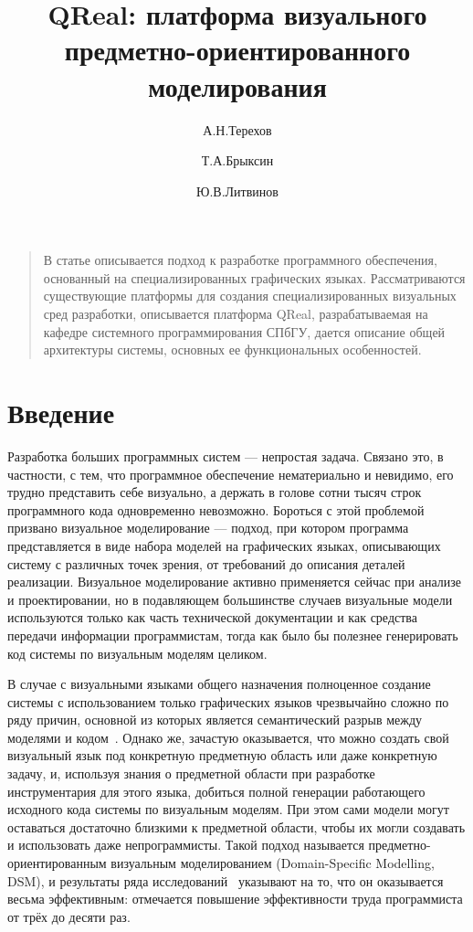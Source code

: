 \documentclass[a4]{article}
\title{QReal: платформа визуального предметно-ориентированного моделирования}
\author{А.Н.Терехов \and Т.А.Брыксин \and Ю.В.Литвинов}
\date{}
\begin{document}
\maketitle
\thispagestyle{empty}

\begin{quote}
\small\noindent
В статье описывается подход к разработке программного обеспечения, основанный на специализированных графических языках. Рассматриваются существующие платформы для создания специализированных визуальных сред разработки, описывается платформа QReal, разрабатываемая на кафедре системного программирования СПбГУ, дается описание общей архитектуры системы, основных ее функциональных особенностей.
\end{quote}

\section*{Введение}

Разработка больших программных систем --- непростая задача. Связано это, в частности, с тем, что программное обеспечение нематериально и невидимо, его трудно представить себе визуально, а держать в голове сотни тысяч строк программного кода одновременно невозможно. Бороться с этой проблемой призвано визуальное моделирование --- подход, при котором программа представляется в виде набора моделей на графических языках, описывающих систему с различных точек зрения, от требований до описания деталей реализации. Визуальное моделирование активно применяется сейчас при анализе и проектировании, но в подавляющем большинстве случаев визуальные модели используются только как часть технической документации и как средства передачи информации программистам, тогда как было бы полезнее генерировать код системы по визуальным моделям целиком.

В случае с визуальными языками общего назначения полноценное создание системы с использованием только графических языков чрезвычайно сложно по ряду причин, основной из которых является семантический разрыв между моделями и кодом~\cite{koznov}. Однако же, зачастую оказывается, что можно создать свой визуальный язык под конкретную предметную область или даже конкретную задачу, и, используя знания о предметной области при разработке инструментария для этого языка, добиться полной генерации работающего исходного кода системы по визуальным моделям. При этом сами модели могут оставаться достаточно близкими к предметной области, чтобы их могли создавать и использовать даже непрограммисты. Такой подход называется предметно-ориентированным визуальным моделированием (Domain-Specific Modelling, DSM), и результаты ряда исследований~\cite{dsm2, dsm3, dsm1} указывают на то, что он оказывается весьма эффективным: отмечается повышение эффективности труда программиста от трёх до десяти раз.
\end{document}
